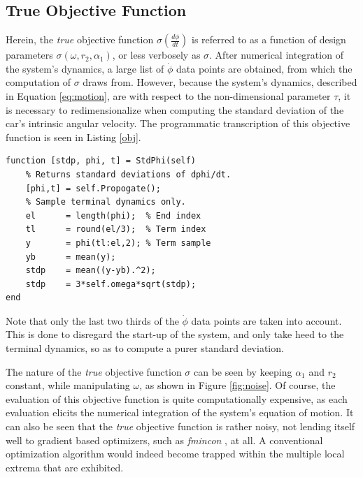 \documentclass{article}
\begin{document}
\subsection{True Objective Function}
 Herein, the \textit{true} objective function $\sigma\left(\frac{d\phi}{dt}\right)$ is referred to as a function of design parameters $\sigma\left(\omega,r_2,\alpha_1\right)$, or less verbosely as $\sigma$. After numerical integration of the system's dynamics, a large list of $\dot{\phi}$ data points are obtained, from which the computation of $\sigma$ draws from. However, because the system's dynamics, described in Equation \ref{eq:motion}, are with respect to the non-dimensional parameter $\tau$, it is necessary to redimensionalize when computing the standard deviation of the car's intrinsic angular velocity. The programmatic transcription of this objective function is seen in Listing \ref{obj}.
 \begin{lstlisting}[caption=\textit{True} Objective Function, label=obj]
 function [stdp, phi, t] = StdPhi(self)
    % Returns standard deviations of dphi/dt.
    [phi,t] = self.Propogate();
    % Sample terminal dynamics only.
    el      = length(phi);  % End index
    tl      = round(el/3);  % Term index
    y       = phi(tl:el,2); % Term sample
    yb      = mean(y);
    stdp    = mean((y-yb).^2);
    stdp    = 3*self.omega*sqrt(stdp);
end
 \end{lstlisting}
Note that only the last two thirds of the $\dot{\phi}$ data points are taken into account. This is done to disregard the start-up of the system, and only take heed to the terminal dynamics, so as to compute a purer standard deviation.

The nature of the \textit{true} objective function $\sigma$ can be seen by keeping $\alpha_1$ and $r_2$ constant, while manipulating $\omega$, as shown in Figure \ref{fig:noise}. Of course, the evaluation of this objective function is quite computationally expensive, as each evaluation elicits the numerical integration of the system's equation of motion. It can also be seen that the \textit{true} objective function is rather noisy, not lending itself well to gradient based optimizers, such as \textit{fmincon} \cite{Matlab}, at all. A conventional optimization algorithm would indeed become trapped within the multiple local extrema that are exhibited.
\end{document}
